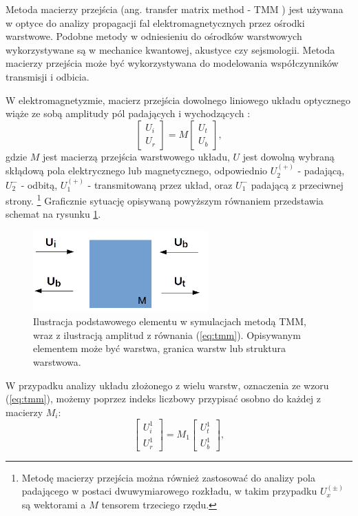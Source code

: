 \label{subart:tmm}
Metoda macierzy przejścia  (ang. transfer matrix method - TMM ) jest używana w optyce do analizy propagacji fal elektromagnetycznych przez ośrodki warstwowe. Podobne metody w odniesieniu do ośrodków warstwowych wykorzystywane są w mechanice kwantowej, akustyce czy sejsmologii. Metoda macierzy przejścia może być wykorzystywana do modelowania współczynników transmisji i odbicia.

W elektromagnetyzmie, macierz przejścia dowolnego liniowego układu optycznego wiąże ze sobą amplitudy pól padających i wychodzących \cite{markos2008wave,teich1991fundamentalsTMM}:
\begin{equation}
\begin{bmatrix}
U_i \\ 
U_r
\end{bmatrix}
= M 
\begin{bmatrix}
U_t \\
U_b
\end{bmatrix},
\label{eq:tmm}
\end{equation}
gdzie $M$ jest macierzą przejścia warstwowego układu, $U$ jest dowolną wybraną skłądową pola elektrycznego lub magnetycznego, odpowiednio $U_2^{(+)}$ - padającą, $U_2^{-}$ - odbitą, $U_1^{(+)}$ - transmitowaną przez układ, oraz $U_1^{-}$ padającą  z przeciwnej strony. \footnote{Metodę macierzy przejścia można również zastosować do analizy pola padającego w postaci dwuwymiarowego rozkładu, w takim przypadku $U_x^{(\pm)}$ są wektorami a $M$ tensorem trzeciego rzędu.} Graficznie sytuację opisywaną powyższym równaniem przedstawia schemat na rysunku \ref{fig:tmm-simple}.

\begin{figure}
	\includegraphics[width=0.6\textwidth]{images/tmm.png}
	\caption{Ilustracja podstawowego elementu w symulacjach metodą TMM, wraz z ilustracją amplitud z równania (\ref{eq:tmm}). Opisywanym elementem może być warstwa, granica warstw lub struktura warstwowa. }
	\label{fig:tmm-simple}
\end{figure}

W przypadku analizy układu złożonego z wielu warstw, oznaczenia ze wzoru (\ref{eq:tmm}), możemy poprzez indeks liczbowy przypisać osobno do każdej z macierzy $M_i$:
\begin{equation}
\begin{bmatrix}
U_i^1 \\ 
U_r^1
\end{bmatrix}
= M_1 
\begin{bmatrix}
U_t^1 \\
U_b^1
\end{bmatrix},
\label{eq:tmm-1l}
\end{equation}

